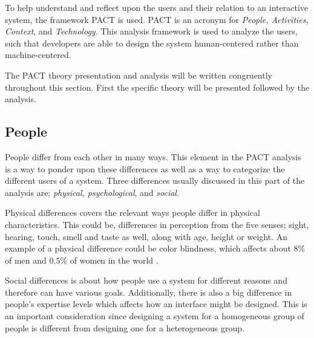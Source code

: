 To help understand and reflect upon the users and their relation to an interactive system, the framework PACT is used.
PACT is an acronym for \textit{People, Activities, Context}, and \textit{Technology}.
This analysis framework is used to analyze the users, such that developers are able to design the system human-centered rather than machine-centered.

The PACT theory presentation and analysis will be written congruently throughout this section. First the specific theory will be presented followed by the analysis.

\subsection{People}\label{sec:PACT-people}
People differ from each other in many ways.
This element in the PACT analysis is a way to ponder upon these differences as well as a way to categorize the different users of a system.
Three differences usually discussed in this part of the analysis are; \textit{physical, psychological}, and \textit{social}.

Physical differences covers the relevant ways people differ in physical characteristics.
This could be, differences in perception from the five senses; sight, hearing, touch, smell and taste as well, along with age, height or weight.
An example of a physical difference could be color blindness, which affects about $8\%$ of men and $0.5\%$ of women in the world \cite{ColourBlind}.

Social differences is about how people use a system for different reasons and therefore can have various goals.
Additionally, there is also a big difference in people's expertise levels which affects how an interface might be designed.
This is an important consideration since designing a system for a homogeneous group of people is  different from designing one for a heterogeneous group.

